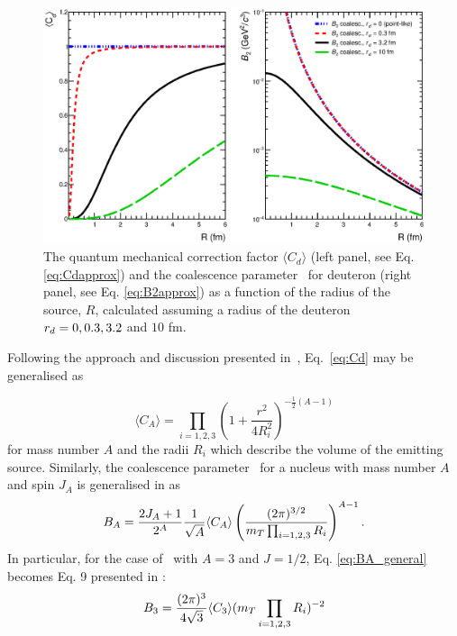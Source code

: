 \documentclass[a4paper,11pt]{scrartcl} %
\begin{document}
\begin{figure}[htbp]
\begin{center}
\includegraphics[width=1.0\textwidth]{theory_coalescence_Cd_B2.eps}
\caption{{The quantum mechanical correction factor $\langle C_{d} \rangle$ (left panel, see Eq. \ref{eq:Cdapprox}) and the coalescence parameter \btwo~for deuteron (right panel, see Eq. \ref{eq:B2approx}) as a function of the radius of the source, $R$, calculated assuming a radius of the deuteron $r_{d} = 0, 0.3, 3.2$ and $10$ fm.}}
\label{fig:radiusDependence}
\end{center}
\end{figure}

Following the approach and discussion presented in~\cite{Blum:2017qnn}, Eq.~\ref{eq:Cd} may be generalised as 

\begin{equation}
\langle C_{A} \rangle = \prod_{i=1,2,3} \left(1 + \frac{r^2}{4R_{i}^2} \right)^{-\frac{1}{2}(A-1)}
\label{eq:CA_general}
\end{equation}
%
for mass number $A$ and the radii $R_{i}$ which describe the volume of the emitting source.
Similarly, the coalescence parameter \bA~for a nucleus with mass number $A$ and spin $J_{A}$ is generalised in \cite{Scheibl:1998tk} as
\begin{equation}
B_{A} = \frac{2J_{A} +1}{2^{A}}\frac{1}{\sqrt{A}}  \langle C_{A} \rangle \left( \frac{(2\pi)^{3/2}} {m_{T}\prod_{i=1,2,3} R_{i}} \right)^{A-1}.
\label{eq:BA_general}
\end{equation}
In particular, for the case of \hethree~with $A=3$ and $J=1/2$, Eq. \ref{eq:BA_general} becomes Eq. 9 presented in \cite{Blum:2017qnn}:
\begin{equation}
B_{3} = \frac{(2\pi)^{3}}{4\sqrt{3}} \langle C_{3} \rangle (m_{T}\prod_{i=1,2,3} R_{i})^{-2}
\label{eq:B3}
\end{equation}
 
\end{document}
